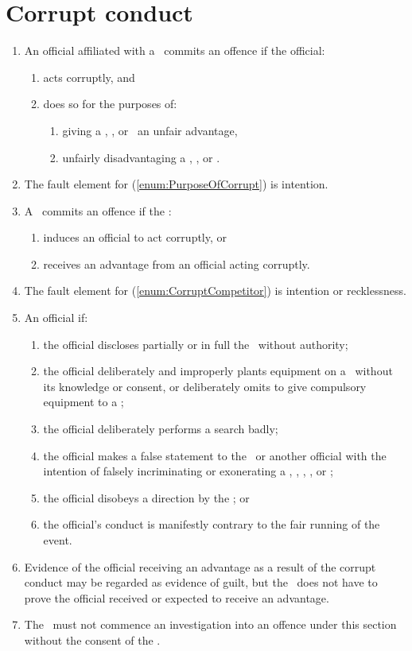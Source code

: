 \documentclass[12pt]{report}
\begin{document}
  \section{Corrupt conduct}
  \begin{enumerate}
    \item An official affiliated with a \residence\ commits an offence if the official:
    \begin{enumerate}
    \item  acts corruptly, and
    \item does so for the purposes of:\label{enum:PurposeOfCorrupt}
     \begin{enumerate}
     \item giving a \team, \squad, or \residence\ an unfair advantage,
     \item unfairly disadvantaging a \team, \squad, or \residence.
  \end{enumerate}
  \end{enumerate}
  \item The fault element for \thesection(\ref{enum:PurposeOfCorrupt}) is intention.
  \item A \competitor\ commits an offence if the \competitor:\label{enum:CorruptCompetitor}
  \begin{enumerate}
    \item induces an official to act corruptly, or
    \item receives an advantage from an official acting corruptly.
  \end{enumerate}
  \item The fault element for \thesection(\ref{enum:CorruptCompetitor}) is intention or recklessness.
  \item An official  if:
  \begin{enumerate}
    \item the official discloses partially or in full the \course\ without authority;
    \item the official deliberately and improperly plants equipment on a \team\ without its knowledge or consent, or deliberately omits to give compulsory equipment to a \team;
    \item the official deliberately performs a search badly;
    \item the official makes a false statement to the \Referee\ or another official with the intention of           falsely incriminating or exonerating a \competitor, \team, \squad, \spectator, or \residence;
    \item the official disobeys a direction by the \RaceDirector; or
    \item the official's conduct is manifestly contrary to the fair running of the event.
  \end{enumerate}
  \item Evidence of the official receiving an advantage as a result of the corrupt conduct may be regarded as evidence of guilt, but the \Referee\ does not have to prove the official received or expected to receive an advantage.
  \item The \Referee\ must not commence an investigation into an offence under this section without the consent of the \RaceDirector.
  \end{enumerate}
\end{document}
